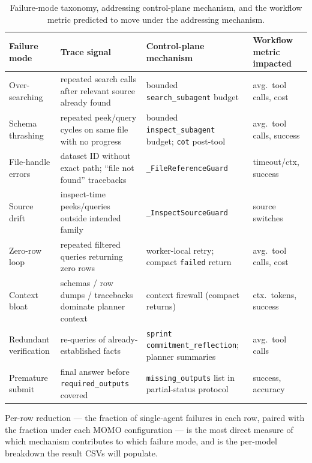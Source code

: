 \begin{table}[t]
\caption{Failure-mode taxonomy, addressing control-plane mechanism, and the workflow metric predicted to move under the addressing mechanism.}
\label{tab:failure}
\centering
\begin{tabular}{p{}p{}p{}p{}}
\toprule
Failure mode & Trace signal & Control-plane mechanism & Workflow metric impacted \\
\midrule
Over-searching          & repeated search calls after relevant source already found & bounded \texttt{search\_subagent} budget                          & avg.\ tool calls, cost \\
Schema thrashing        & repeated peek/query cycles on same file with no progress  & bounded \texttt{inspect\_subagent} budget; \texttt{cot} post-tool & avg.\ tool calls, success \\
File-handle errors      & dataset ID without exact path; ``file not found'' tracebacks & \texttt{\_FileReferenceGuard}                                  & timeout/ctx, success \\
Source drift            & inspect-time peeks/queries outside intended family        & \texttt{\_InspectSourceGuard}                                     & source switches \\
Zero-row loop           & repeated filtered queries returning zero rows             & worker-local retry; compact \texttt{failed} return                & avg.\ tool calls, cost \\
Context bloat           & schemas / row dumps / tracebacks dominate planner context & context firewall (compact returns)                                & ctx.\ tokens, success \\
Redundant verification  & re-queries of already-established facts                   & \texttt{sprint} \texttt{commitment\_reflection}; planner summaries & avg.\ tool calls \\
Premature submit        & final answer before \texttt{required\_outputs} covered    & \texttt{missing\_outputs} list in partial-status protocol         & success, accuracy \\
\bottomrule
\end{tabular}
\end{table}

Per-row reduction --- the fraction of single-agent failures in each row, paired with the fraction under each MOMO configuration --- is the most direct measure of which mechanism contributes to which failure mode, and is the per-model breakdown the result CSVs will populate.

